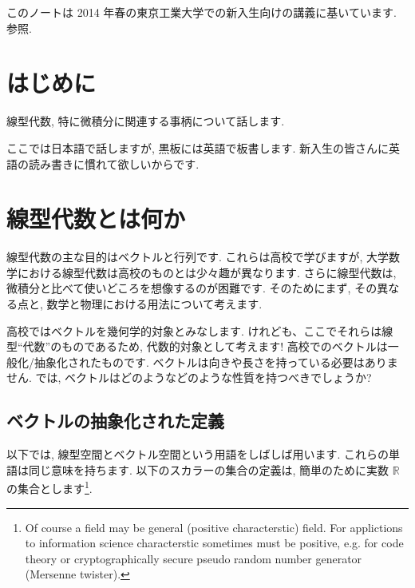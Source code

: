 \documentclass[openany, a4paper, oneside]{book}
\theoremstyle{break}
\theoremstyle{breakdefn}
\newcommand{\bbR}{\mathbb{R}}
\begin{document}
このノートは 2014 年春の東京工業大学での新入生向けの講義に基いています.
\cite{MasahikoSaitoh1, AsaoArai3, AraiEzawa1, AraiEzawa2, KenjiFukaya2, ToshioNiwa1} 参照.
\section{はじめに}
\label{sec-4-1-1}

線型代数, 特に微積分に関連する事柄について話します.

ここでは日本語で話しますが, 黒板には英語で板書します.
新入生の皆さんに英語の読み書きに慣れて欲しいからです.
\section{線型代数とは何か}
\label{sec-4-1-2}

線型代数の主な目的はベクトルと行列です.
これらは高校で学びますが,
大学数学における線型代数は高校のものとは少々趣が異なります.
さらに線型代数は, 微積分と比べて使いどころを想像するのが困難です.
そのためにまず, その異なる点と, 数学と物理における用法について考えます.

高校ではベクトルを幾何学的対象とみなします.
けれども、ここでそれらは線型``代数''のものであるため,
代数的対象として考えます!
高校でのベクトルは一般化/抽象化されたものです.
ベクトルは向きや長さを持っている必要はありません.
では, ベクトルはどのようなどのような性質を持つべきでしょうか?
\subsection{ベクトルの抽象化された定義}
\label{sec-4-1-2-1}

以下では, 線型空間とベクトル空間という用語をしばしば用います.
これらの単語は同じ意味を持ちます.
以下のスカラーの集合の定義は, 簡単のために実数 $\bbR$ の集合とします\footnote{
Of course a field may be general (positive characterstic) field.
For applictions to information science characterstic sometimes must be positive, e.g. for code theory or
cryptographically secure pseudo random number generator (Mersenne twister).
}.
\end{document}
